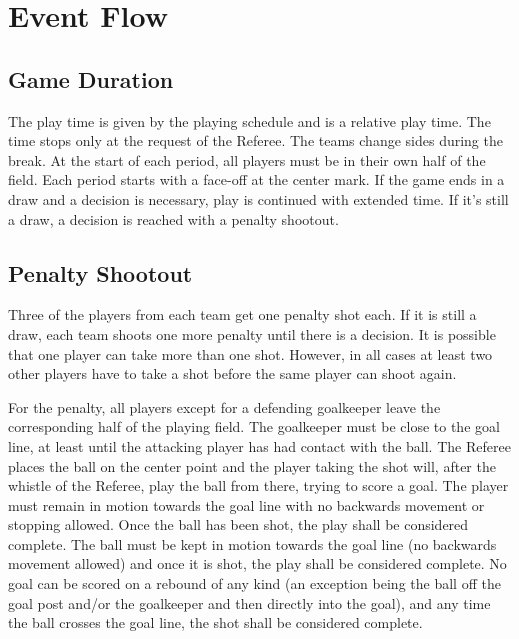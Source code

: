 \section{Event Flow}

\subsection{Game Duration}

The play time is given by the playing schedule and is a relative play time.
The time stops only at the request of the Referee.
The teams change sides during the break.
At the start of each period, all players must be in their own half of the field.
Each period starts with a face-off at the center mark.
If the game ends in a draw and a decision is necessary, play is continued with extended time.
If it's still a draw, a decision is reached with a penalty shootout.

\subsection{Penalty Shootout}
Three of the players from each team get one penalty shot each.
If it is still a draw, each team shoots one more penalty until there is a decision.
It is possible that one player can take more than one shot.
However, in all cases at least two other players have to take a shot before the same player can shoot again.

For the penalty, all players except for a defending goalkeeper leave the corresponding half of the playing field.
The goalkeeper must be close to the goal line, at least until the attacking player has had contact with the ball.
The Referee places the ball on the center point and the player taking the shot will, after the whistle of the Referee, play the ball from there, trying to score a goal.
The player must remain in motion towards the goal line with no backwards movement or stopping allowed.
Once the ball has been shot, the play shall be considered complete.
The ball must be kept in motion towards the goal line (no backwards movement allowed) and once it is shot, the play shall be considered complete.
No goal can be scored on a rebound of any kind (an exception being the ball off the goal post and/or the goalkeeper and then directly into the goal), and any time the ball crosses the goal line, the shot shall be considered complete.

